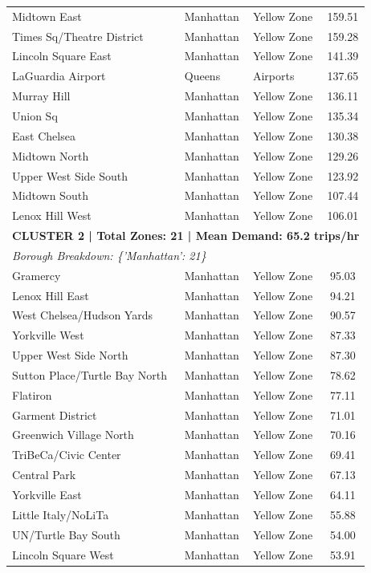 \documentclass[11pt,a4paper]{article}
\begin{document}
\begin{table}[htbp]
\begin{tabular}{lllc}
        \midrule
        Midtown East & Manhattan & Yellow Zone & 159.51 \\
        Times Sq/Theatre District & Manhattan & Yellow Zone & 159.28 \\
        Lincoln Square East & Manhattan & Yellow Zone & 141.39 \\
        LaGuardia Airport & Queens & Airports & 137.65 \\
        Murray Hill & Manhattan & Yellow Zone & 136.11 \\
        Union Sq & Manhattan & Yellow Zone & 135.34 \\
        East Chelsea & Manhattan & Yellow Zone & 130.38 \\
        Midtown North & Manhattan & Yellow Zone & 129.26 \\
        Upper West Side South & Manhattan & Yellow Zone & 123.92 \\
        Midtown South & Manhattan & Yellow Zone & 107.44 \\
        Lenox Hill West & Manhattan & Yellow Zone & 106.01 \\
        \midrule
        \multicolumn{4}{l}{\textbf{CLUSTER 2 | Total Zones: 21 | Mean Demand: 65.2 trips/hr}} \\
        \multicolumn{4}{l}{\textit{Borough Breakdown: \{'Manhattan': 21\}}} \\
        \midrule
        Gramercy & Manhattan & Yellow Zone & 95.03 \\
        Lenox Hill East & Manhattan & Yellow Zone & 94.21 \\
        West Chelsea/Hudson Yards & Manhattan & Yellow Zone & 90.57 \\
        Yorkville West & Manhattan & Yellow Zone & 87.33 \\
        Upper West Side North & Manhattan & Yellow Zone & 87.30 \\
        Sutton Place/Turtle Bay North & Manhattan & Yellow Zone & 78.62 \\
        Flatiron & Manhattan & Yellow Zone & 77.11 \\
        Garment District & Manhattan & Yellow Zone & 71.01 \\
        Greenwich Village North & Manhattan & Yellow Zone & 70.16 \\
        TriBeCa/Civic Center & Manhattan & Yellow Zone & 69.41 \\
        Central Park & Manhattan & Yellow Zone & 67.13 \\
        Yorkville East & Manhattan & Yellow Zone & 64.11 \\
        Little Italy/NoLiTa & Manhattan & Yellow Zone & 55.88 \\
        UN/Turtle Bay South & Manhattan & Yellow Zone & 54.00 \\
        Lincoln Square West & Manhattan & Yellow Zone & 53.91 \\
        \bottomrule
    \end{tabular}
\end{table}
\end{document}

